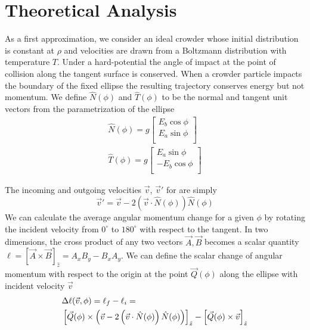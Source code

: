 \section{Theoretical Analysis}
As a first approximation, we consider an ideal crowder whose initial distribution is constant at $\rho$ and velocities are drawn from a Boltzmann distribution with temperature $T$. Under a hard-potential the angle of impact at the point of collision along the tangent surface is conserved. When a crowder particle impacts the boundary of the fixed ellipse the resulting trajectory conserves energy but not momentum. We define $\hat N(\phi)$ and $\hat T(\phi)$ to be the normal and tangent unit vectors from the parametrization of the ellipse
%
\begin{align}
\hat N(\phi) = g
\begin{bmatrix}
	E_b \cos \phi \\
	E_a \sin \phi \\
\end{bmatrix}  \\
\hat T(\phi) = g
\begin{bmatrix}
	E_a \sin \phi \\
	-E_b \cos \phi \\
\end{bmatrix}
\end{align}

The incoming and outgoing velocities $\vec v$, $\vec v'$ for are simply
%
\begin{equation}
\vec v' = \vec v - 2 \left ( \vec v \cdot \hat N(\phi) \right ) \hat N(\phi)  
\end{equation}
We can calculate the average angular momentum change for a given $\phi$ by rotating the incident velocity from $0^\circ$ to $180^\circ$ with respect to the tangent. In two dimensions, the cross product of any two vectors $\vec A, \vec B$ becomes a scalar quantity $\ell = \left[ \vec A \times \vec B \right]_{\hat z}=A_x B_y - B_x A_y$. We can define the scalar change of angular momentum with respect to the origin at the point $\vec Q(\phi)$ along the ellipse with incident velocity $\vec v$
%
\begin{align}
& \Delta \ell(\vec v, \phi) = \ell_f - \ell_i = \\
& \left [ \vec Q(\phi) \times \left ( \vec v - 2 \left ( \vec v \cdot \hat N(\phi) \right ) \hat N(\phi) \right ) \right ] _{\hat z} -
\left [\vec Q(\phi) \times \vec v \right ] _{\hat z} \notag
\end{align}


